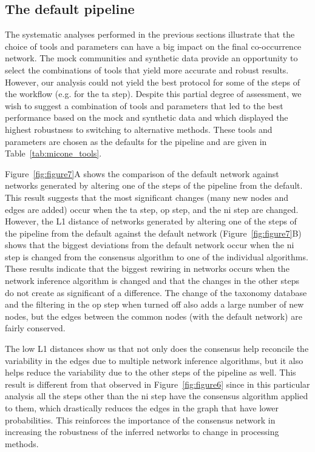  \FloatBarrier

  \subsection*{The default pipeline}

  The systematic analyses performed in the previous sections illustrate that the choice of tools and parameters can have a big impact on the final co-occurrence network.
  The mock communities and synthetic data provide an opportunity to select the combinations of tools that yield more accurate and robust results.
  However, our analysis could not yield the best protocol for some of the steps of the workflow (e.g. for the \ac{ta} step).
  Despite this partial degree of assessment, we wish to suggest a combination of tools and parameters that led to the best performance based on the mock and synthetic data and which displayed the highest robustness to switching to alternative methods.
  These tools and parameters are chosen as the defaults for the pipeline and are given in Table~\ref{tab:micone_tools}.

  Figure~\ref{fig:figure7}A shows the comparison of the default network against networks generated by altering one of the steps of the pipeline from the default.
  This result suggests that the most significant changes (many new nodes and edges are added) occur when the \ac{ta} step, \ac{op} step, and the \ac{ni} step are changed.
  However, the L1 distance of networks generated by altering one of the steps of the pipeline from the default against the default network (Figure~\ref{fig:figure7}B) shows that the biggest deviations from the default network occur when the \ac{ni} step is changed from the consensus algorithm to one of the individual algorithms.
  These results indicate that the biggest rewiring in networks occurs when the network inference algorithm is changed and that the changes in the other steps do not create as significant of a difference.
  The change of the taxonomy database and the filtering in the \ac{op} step when turned off also adds a large number of new nodes, but the edges between the common nodes (with the default network) are fairly conserved.

  The low L1 distances show us that not only does the consensus help reconcile the variability in the edges due to multiple network inference algorithms, but it also helps reduce the variability due to the other steps of the pipeline as well.
  This result is different from that observed in Figure~\ref{fig:figure6} since in this particular analysis all the steps other than the \ac{ni} step have the consensus algorithm applied to them, which drastically reduces the edges in the graph that have lower probabilities.
  This reinforces the importance of the consensus network in increasing the robustness of the inferred networks to change in processing methods.

